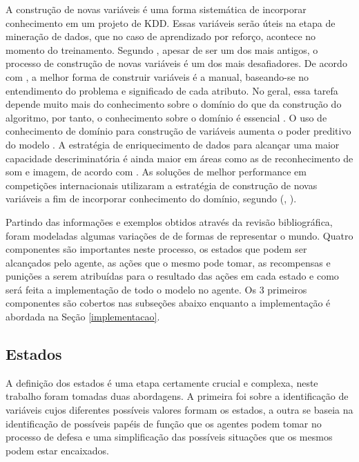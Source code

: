 
A construção de novas variáveis é uma forma sistemática de incorporar
conhecimento em um projeto de KDD. Essas variáveis serão úteis na etapa de
mineração de dados, que no caso de aprendizado por reforço, acontece no momento
do treinamento. Segundo , apesar de ser um dos
mais antigos, o processo de construção de novas variáveis é um dos mais
desafiadores. De acordo com , a melhor forma de
construir variáveis é a manual, baseando-se no entendimento do problema e
significado de cada atributo. No geral, essa tarefa depende muito mais do
conhecimento sobre o domínio do que da construção do algoritmo, por tanto, o
conhecimento sobre o domínio é essencial \cite{zhao2009effects}. O uso de
conhecimento de domínio para construção de variáveis aumenta o poder preditivo
do modelo \cite{zhao2009effects}. A estratégia de enriquecimento de dados para
alcançar uma maior capacidade descriminatória é ainda maior em áreas como as de
reconhecimento de som e imagem, de acordo com . As
soluções de melhor performance em competições internacionais utilizaram a
estratégia de construção de novas variáveis a fim de incorporar conhecimento do
domínio, segundo 
(\citeyear{adeodato2008power}, \citeyear{adeodato2009role}).

Partindo das informações e exemplos obtidos através da revisão bibliográfica,
foram modeladas algumas variações de de formas de representar o mundo. Quatro
componentes são importantes neste processo, os estados que podem ser alcançados
pelo agente, as ações que o mesmo pode tomar, as recompensas e punições a serem
atribuídas para o resultado das ações em cada estado e como será feita a
implementação de todo o modelo no agente. Os 3 primeiros componentes são
cobertos nas subseções abaixo enquanto a implementação é abordada na Seção
\ref{implementacao}.

\subsection{Estados}\label{states}

A definição dos estados é uma etapa certamente crucial e complexa, neste
trabalho foram tomadas duas abordagens. A primeira foi sobre a identificação de
variáveis cujos diferentes possíveis valores formam os estados, a outra se
baseia na identificação de possíveis papéis de função que os agentes podem tomar
no processo de defesa e uma simplificação das possíveis situações que os mesmos
podem estar encaixados.


